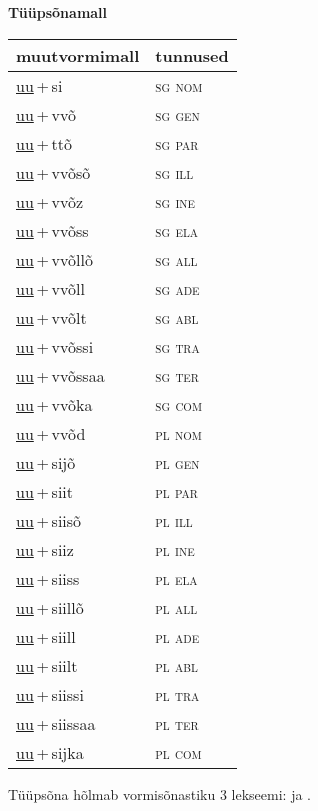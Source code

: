 
\vspace{1.8em}
\begin{minipage}{\textwidth}
\textbf{Tüüpsõnamall \,}\\

\begin{sideways}
\begin{tabular}{l l}
muutvormimall & tunnused \\
\hline
\underline{uu}\,+\,si & \textsc{ sg nom } \\
\underline{uu}\,+\,vvõ & \textsc{ sg gen } \\
\underline{uu}\,+\,ttõ & \textsc{ sg par } \\
\underline{uu}\,+\,vvõsõ & \textsc{ sg ill } \\
\underline{uu}\,+\,vvõz & \textsc{ sg ine } \\
\underline{uu}\,+\,vvõss & \textsc{ sg ela } \\
\underline{uu}\,+\,vvõllõ & \textsc{ sg all } \\
\underline{uu}\,+\,vvõll & \textsc{ sg ade } \\
\underline{uu}\,+\,vvõlt & \textsc{ sg abl } \\
\underline{uu}\,+\,vvõssi & \textsc{ sg tra } \\
\underline{uu}\,+\,vvõssaa & \textsc{ sg ter } \\
\underline{uu}\,+\,vvõka & \textsc{ sg com } \\
\underline{uu}\,+\,vvõd & \textsc{ pl nom } \\
\underline{uu}\,+\,sijõ & \textsc{ pl gen } \\
\underline{uu}\,+\,siit & \textsc{ pl par } \\
\underline{uu}\,+\,siisõ & \textsc{ pl ill } \\
\underline{uu}\,+\,siiz & \textsc{ pl ine } \\
\underline{uu}\,+\,siiss & \textsc{ pl ela } \\
\underline{uu}\,+\,siillõ & \textsc{ pl all } \\
\underline{uu}\,+\,siill & \textsc{ pl ade } \\
\underline{uu}\,+\,siilt & \textsc{ pl abl } \\
\underline{uu}\,+\,siissi & \textsc{ pl tra } \\
\underline{uu}\,+\,siissaa & \textsc{ pl ter } \\
\underline{uu}\,+\,sijka & \textsc{ pl com } \\
\end{tabular}
\end{sideways}
\label{tab:tüüpsõnamall-uusi}

\end{minipage}

 
\vspace{1em}
\noindent Tüüpsõna hõlmab vormisõnastiku 3 lekseemi:  ja .
